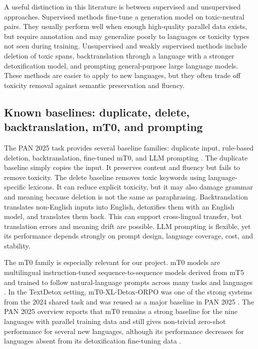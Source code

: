\documentclass{article}
\begin{document}
A useful distinction in this literature is between supervised and unsupervised approaches. Supervised methods fine-tune a generation model on toxic-neutral pairs. They usually perform well when enough high-quality parallel data exists, but require annotation and may generalize poorly to languages or toxicity types not seen during training. Unsupervised and weakly supervised methods include deletion of toxic spans, backtranslation through a language with a stronger detoxification model, and prompting general-purpose large language models. These methods are easier to apply to new languages, but they often trade off toxicity removal against semantic preservation and fluency.

\subsection{Known baselines: duplicate, delete, backtranslation, mT0, and prompting}

The PAN 2025 task provides several baseline families: duplicate input, rule-based deletion, backtranslation, fine-tuned mT0, and LLM prompting \cite{pan25taskpage,dementieva2025pantextdetox}. The duplicate baseline simply copies the input. It preserves content and fluency but fails to remove toxicity. The delete baseline removes toxic keywords using language-specific lexicons. It can reduce explicit toxicity, but it may also damage grammar and meaning because deletion is not the same as paraphrasing. Backtranslation translates non-English inputs into English, detoxifies them with an English model, and translates them back. This can support cross-lingual transfer, but translation errors and meaning drift are possible. LLM prompting is flexible, yet its performance depends strongly on prompt design, language coverage, cost, and stability.

The mT0 family is especially relevant for our project. mT0 models are multilingual instruction-tuned sequence-to-sequence models derived from mT5 and trained to follow natural-language prompts across many tasks and languages \cite{xue2021mt5,muennighoff2023mt0}. In the TextDetox setting, mT0-XL-Detox-ORPO was one of the strong systems from the 2024 shared task and was reused as a major baseline in PAN 2025 \cite{dementieva2025pantextdetox}. The PAN 2025 overview reports that mT0 remains a strong baseline for the nine languages with parallel training data and still gives non-trivial zero-shot performance for several new languages, although its performance decreases for languages absent from its detoxification fine-tuning data \cite{dementieva2025pantextdetox}.
\end{document}
